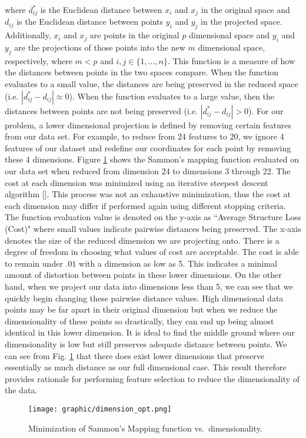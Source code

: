 \documentclass[]{aiaa-tc}
\begin{document}
\noindent where $d^*_{ij}$ is the Euclidean distance between $x_i$ and $x_j$ in the original space and $d_{ij}$ is the Euclidean distance between points $y_i$ and $y_j$ in the projected space. Additionally, $x_i$ and $x_j$ are points in the original $p$ dimensional space and  $y_i$ and $y_j$ are the projections of those points into the new $m$ dimensional space, respectively, where $m<p$ and $i,j \in \{1,...,n\}$. This function is a measure of how the distances between points in the two spaces compare. When the function evaluates to a small value, the distances are being preserved in the reduced space (i.e. $|d_{ij}^* - d_{ij}| \approx 0$). When the function evaluates to a large value, then the distances between points are not being preserved (i.e. $|d^*_{ij} -d_{ij}| > 0$). For our problem, a lower dimensional projection is defined by removing certain features from our data set. For example, to reduce from 24 features to 20, we ignore 4 features of our dataset and redefine our coordinates for each point by removing these 4 dimensions. 
Figure \ref{fig:sammon} shows the Sammon's mapping function evaluated on our data set when reduced from dimension 24 to dimensions 3 through 22. The cost at each dimension was minimized using an iterative steepest descent algorithm []. This process was not an exhaustive minimization, thus the cost at each dimension may differ if performed again using different stopping criteria. The function evaluation value is denoted on the y-axis as ``Average Structure Loss (Cost)" where small values indicate pairwise distances being preserved. The x-axis denotes the size of the reduced dimension we are projecting onto. There is a degree of freedom in choosing what values of cost are acceptable. The cost is able to remain under $.01$ with a dimension as low as 5. This indicates a minimal amount of distortion between points in these lower dimensions. On the other hand, when we project our data into dimensions less than 5, we can see that we quickly begin changing these pairwise distance values. High dimensional data points may be far apart in their original dimension but when we reduce the dimensionality of these points so drastically, they can end up being almost identical in this lower dimension. It is ideal to find the middle ground where our dimensionality is low but still preserves adequate distance between points. We can see from Fig. \ref{fig:sammon} that there does exist lower dimensions that preserve essentially as much distance as our full dimensional case. This result therefore provides rationale for performing feature selection to reduce the dimensionality of the data.  
\begin{figure}[h!]
\centering
  \texttt{[image: graphic/dimension\_opt.png]}
  \caption{Minimization of Sammon's Mapping function vs.\ dimensionality. }
  \label{fig:sammon}
\end{figure}
\end{document}
